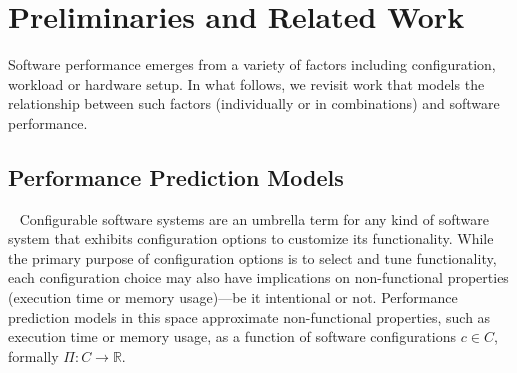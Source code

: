 \section{Preliminaries and Related Work}
{
\color{brown}
Software performance emerges from a variety of factors including configuration, workload or hardware setup. In what follows, we revisit work that models the relationship between  such factors (individually or in combinations) and software performance.

}
\subsection{Performance Prediction Models}~\label{sec:perfmodels}
Configurable software systems are an umbrella term for any kind of software system that exhibits configuration options to customize its functionality. While the primary purpose of configuration options is to select and tune functionality, each configuration choice may also have implications on non-functional properties (execution time or memory usage)---be it intentional or not. 
Performance prediction models in this space approximate non-functional properties, such as execution time or memory usage, as a function of software configurations $c \in C$, formally $\Pi: C \rightarrow \mathbb{R}$. 


